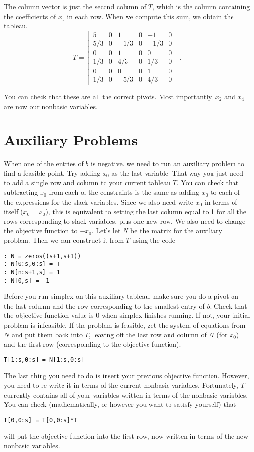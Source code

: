 The column vector is just the second column of $T$, which is the column containing the coefficients of $x_1$ in each row.
When we compute this sum, we obtain the tableau.
\[
	T = \begin{bmatrix}
		5 &  0 & 1 & 0 & -1 & 0 \\
		5/3 & 0 &-1/3 & 0 &-1/3 & 0 \\
		0 & 0 & 1 & 0 & 0 & 0 \\
		1/3 & 0 & 4/3 & 0 & 1/3 & 0 \\
		0 & 0 & 0 & 0 & 1 & 0 \\
		1/3 & 0 & -5/3 & 0 & 4/3 & 0
	\end{bmatrix}.
\]

You can check that these are all the correct pivots.
Most importantly, $x_2$ and $x_4$ are now our nonbasic variables.

\section*{Auxiliary Problems}

When one of the entries of $b$ is negative, we need to run an auxiliary problem to find a feasible point.
Try adding $x_0$ as the last variable.
That way you just need to add a single row and column to your current tableau $T$.
You can check that subtracting $x_0$ from each of the constraints is the same as adding $x_0$ to each of the expressions for the slack variables.
Since we also need write $x_0$ in terms of itself ($x_0 = x_0$), this is equivalent to setting the last column equal to 1 for all the rows corresponding to slack variables, plus one new row.
We also need to change the objective function to $-x_0$.
Let's let $N$ be the matrix for the auxiliary problem.
Then we can construct it from $T$ using the code 
\begin{lstlisting}
: N = zeros((s+1,s+1))
: N[0:s,0:s] = T
: N[n:s+1,s] = 1
: N[0,s] = -1
\end{lstlisting}

Before you run simplex on this auxiliary tableau, make sure you do a pivot on the last column and the row corresponding to the smallest entry of $b$.
Check that the objective function value is 0 when simplex finishes running.
If not, your initial problem is infeasible.
If the problem is feasible, get the system of equations from $N$ and put them back into $T$, leaving off the last row and column of $N$ (for $x_0$) and the first row (corresponding to the objective function).
\begin{lstlisting}
T[1:s,0:s] = N[1:s,0:s]
\end{lstlisting}
The last thing you need to do is insert your previous objective function.
However, you need to re-write it in terms of the current nonbasic variables.
Fortunately, $T$ currently contains all of your variables written in terms of the nonbasic variables.
You can check (mathematically, or however you want to satisfy yourself) that
\begin{lstlisting}
T[0,0:s] = T[0,0:s]*T
\end{lstlisting}
will put the objective function into the first row, now written in terms of the new nonbasic variables.

